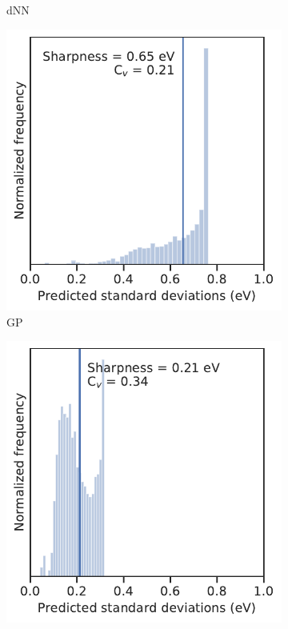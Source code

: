 \documentclass[]{achemso}
\begin{document}
\begin{figure}
\begin{subfigure}{0.32\textwidth}
        \caption{\gls{dNN}}\label{fig:sharpness_dnn}
    \end{subfigure}
    \begin{subfigure}{0.32\textwidth}
        \includegraphics[width=\textwidth]{../GP/Matern/sharpness.pdf}
        \caption{\gls{GP}}\label{fig:sharpness_gp}
    \end{subfigure}
    \begin{subfigure}{0.32\textwidth}
        \includegraphics[width=\textwidth]{../GPnnm/Matern/sharpness.pdf}

\end{subfigure}
\end{figure}
\end{document}
